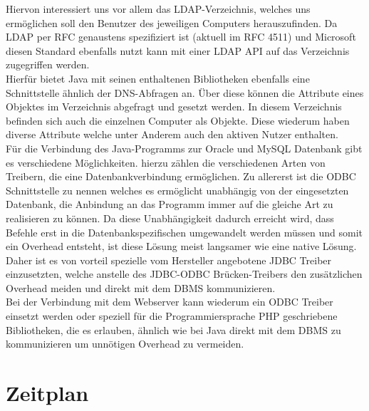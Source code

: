 Hiervon interessiert uns vor allem das LDAP-Verzeichnis, welches uns ermöglichen soll den Benutzer des jeweiligen Computers herauszufinden.
Da LDAP per RFC genaustens spezifiziert ist (aktuell im RFC 4511) und Microsoft diesen Standard ebenfalls nutzt kann mit einer LDAP API auf das Verzeichnis zugegriffen werden.\\
Hierfür bietet Java mit seinen enthaltenen Bibliotheken ebenfalls eine Schnittstelle ähnlich der DNS-Abfragen an. Über diese können die Attribute eines Objektes im Verzeichnis abgefragt und gesetzt werden. In diesem Verzeichnis befinden sich auch die einzelnen Computer als Objekte. Diese wiederum haben diverse Attribute welche unter Anderem auch den aktiven Nutzer enthalten.\\
Für die Verbindung des Java-Programms zur Oracle und MySQL Datenbank gibt es verschiedene Möglichkeiten. hierzu zählen die verschiedenen Arten von Treibern, die eine Datenbankverbindung ermöglichen. Zu allererst ist die ODBC Schnittstelle zu nennen welches es ermöglicht unabhängig von der eingesetzten Datenbank, die Anbindung an das Programm immer auf die gleiche Art zu realisieren zu können. Da diese Unabhängigkeit dadurch erreicht wird, dass Befehle erst in die Datenbankspezifischen umgewandelt werden müssen und somit ein Overhead entsteht, ist diese Lösung meist langsamer wie eine native Lösung. Daher ist es von vorteil spezielle vom Hersteller angebotene JDBC Treiber einzusetzten, welche anstelle des JDBC-ODBC Brücken-Treibers den zusätzlichen Overhead meiden und direkt mit dem DBMS kommunizieren.\\
Bei der Verbindung mit dem Webserver kann wiederum ein ODBC Treiber einsetzt werden oder speziell für die Programmiersprache PHP geschriebene Bibliotheken, die es erlauben, ähnlich wie bei Java direkt mit dem DBMS zu kommunizieren um unnötigen Overhead zu vermeiden.\\

\section{Zeitplan}
\label{sec:timetable}

